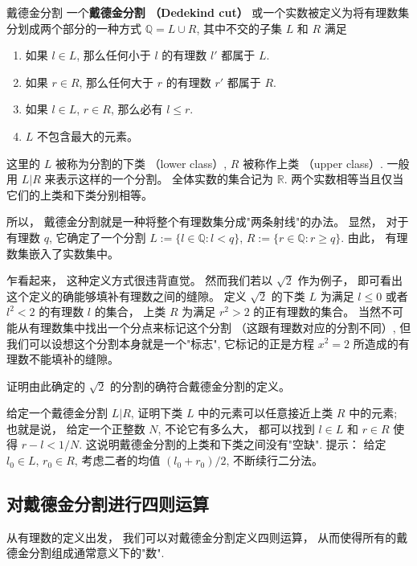 \begin{definition}{戴德金分割}
一个\textbf{戴德金分割 （Dedekind cut）} 或一个实数被定义为将有理数集分划成两个部分的一种方式 $\mathbb{Q}=L\cup R$, 其中不交的子集 $L$ 和 $R$ 满足

\begin{enumerate}
\item 如果 $l\in L$, 那么任何小于 $l$ 的有理数 $l'$ 都属于 $L$.
\item 如果 $r\in R$, 那么任何大于 $r$ 的有理数 $r'$ 都属于 $R$.
\item 如果 $l\in L$, $r\in R$, 那么必有 $l\leq r$.
\item $L$ 不包含最大的元素。
\end{enumerate}

这里的 $L$ 被称为分割的下类 （lower class）, $R$ 被称作上类 （upper class）. 一般用 $L|R$ 来表示这样的一个分割。 全体实数的集合记为 $\mathbb{R}$. 两个实数相等当且仅当它们的上类和下类分别相等。
\end{definition}

所以， 戴德金分割就是一种将整个有理数集分成"两条射线"的办法。 显然， 对于有理数 $q$, 它确定了一个分割 $L:=\{l\in\mathbb{Q}:l<q\}$, $R:=\{r\in\mathbb{Q}:r\geq q\}$. 由此， 有理数集嵌入了实数集中。

乍看起来， 这种定义方式很违背直觉。 然而我们若以 $\sqrt{2}$ 作为例子， 即可看出这个定义的确能够填补有理数之间的缝隙。 定义 $\sqrt{2}$ 的下类 $L$ 为满足 $l\leq0$ 或者 $l^2<2$ 的有理数 $l$ 的集合， 上类 $R$ 为满足 $r^2>2$ 的正有理数的集合。 当然不可能从有理数集中找出一个分点来标记这个分割 （这跟有理数对应的分割不同）, 但我们可以设想这个分割本身就是一个"标志", 它标记的正是方程 $x^2=2$ 所造成的有理数不能填补的缝隙。
\begin{exercise}{}
证明由此确定的 $\sqrt{2}$ 的分割的确符合戴德金分割的定义。
\end{exercise}

\begin{exercise}{}
给定一个戴德金分割 $L|R$, 证明下类 $L$ 中的元素可以任意接近上类 $R$ 中的元素; 也就是说， 给定一个正整数 $N$, 不论它有多么大， 都可以找到 $l\in L$ 和 $r\in R$ 使得 $r-l<1/N$. 这说明戴德金分割的上类和下类之间没有"空缺". 提示： 给定 $l_0\in L$, $r_0\in R$, 考虑二者的均值 $(l_0+r_0)/2$, 不断续行二分法。
\end{exercise}

\subsection{对戴德金分割进行四则运算}
从有理数的定义出发， 我们可以对戴德金分割定义四则运算， 从而使得所有的戴德金分割组成通常意义下的"数". 

